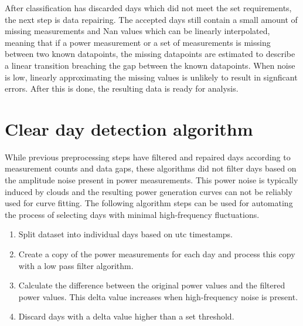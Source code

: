 \noindent After classification has discarded days which did not meet the set requirements, the next step is data repairing. The accepted days still contain a small amount of missing measurements and Nan values which can be linearly interpolated, meaning that if a power measurement or a set of measurements is missing between two known datapoints, the missing datapoints are estimated to describe a linear transition breaching the gap between the known datapoints. When noise is low, linearly approximating the missing values is unlikely to result in signficant errors. After this is done, the resulting data is ready for analysis.



\section{Clear day detection algorithm}
\label{clearskyalgo_chapter}
While previous preprocessing steps have filtered and repaired days according to measurement counts and data gaps, these algorithms did not filter days based on the amplitude noise present in power measurements. This power noise is typically induced by clouds and the resulting power generation curves can not be reliably used for curve fitting. The following algorithm steps can be used for automating the process of selecting days with minimal high-frequency fluctuations.






\begin{enumerate}
  \item Split dataset into individual days based on utc timestamps.
  
  \item Create a copy of the power measurements for each day and process this copy with a low pass filter algorithm.

  
  \item Calculate the difference between the original power values and the filtered power values. This delta value increases when high-frequency noise is present.
  
  
  \item Discard days with a delta value higher than a set threshold.
  

\end{enumerate}




